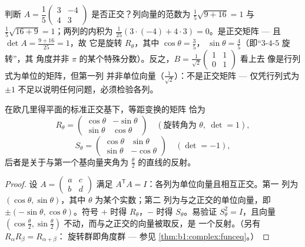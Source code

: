 \begin{example}[一眼识别等距变换]
\label{ex:b1:euclid:recognize}
判断 $A = \dfrac15\begin{pmatrix} 3 & -4\\ 4 & 3\end{pmatrix}$
是否正交？列向量的范数为 $\frac15\sqrt{9 + 16} = 1$ 与
$\frac15\sqrt{16 + 9} = 1$；两列的内积为 $\frac1{25}(3\cdot(-4) +
4\cdot3) = 0$。是正交矩阵 --- 且 $\det A = \frac{9 + 16}{25} = 1$，故
它是旋转 $R_\theta$，其中 $\cos\theta = \frac35$，
$\sin\theta = \frac45$（即“$3$-$4$-$5$ 旋转”，其
角度并非 $\pi$ 的某个特殊分数）。反之，$B =
\frac{1}{\sqrt2}\begin{pmatrix} 1 & 1\\ 0 & 1\end{pmatrix}$ 看上去
像是行列式为单位的矩阵，但第一列
并非单位向量（$\frac1{\sqrt2}$）：不是正交矩阵 --- 仅凭行列式为 $\pm1$
不足以说明任何问题，必须检验各列。
\end{example}

\begin{theorem}[平面上的等距变换]\label{thm:b1:euclid:plane}
在欧几里得平面的标准正交基下，等距变换的矩阵
恰为
\[
R_\theta = \begin{pmatrix}
\cos\theta & -\sin\theta\\ \sin\theta & \cos\theta
\end{pmatrix}
\quad (\text{旋转角为 } \theta,\ \det = 1),
\]
\[
S_\theta = \begin{pmatrix}
\cos\theta & \sin\theta\\ \sin\theta & -\cos\theta
\end{pmatrix}
\quad (\det = -1),
\]
后者是关于与第一个基向量夹角为
$\frac\theta2$ 的直线的反射。
\end{theorem}

\begin{proof}
设 $A = \begin{pmatrix} a & c\\ b & d\end{pmatrix}$ 满足
$A^{\mathsf T}A = I$：各列为单位向量且相互正交。第一
列为 $(\cos\theta, \sin\theta)$，其中 $\theta$ 为某个实数；第二
列为与之正交的单位向量，即 $\pm(-\sin\theta, \cos\theta)$。符号
$+$ 时得 $R_\theta$，$-$ 时得 $S_\theta$。易验证
$S_\theta^2 = I$，且向量 $(\cos\frac\theta2,
\sin\frac\theta2)$ 不动，而与之正交的向量被取反，是
一个反射。（另有 $R_\alpha R_\beta = R_{\alpha+\beta}$：
旋转群即角度群 --- 参见
\cref{thm:b1:complex:funceq}。）
\end{proof}

